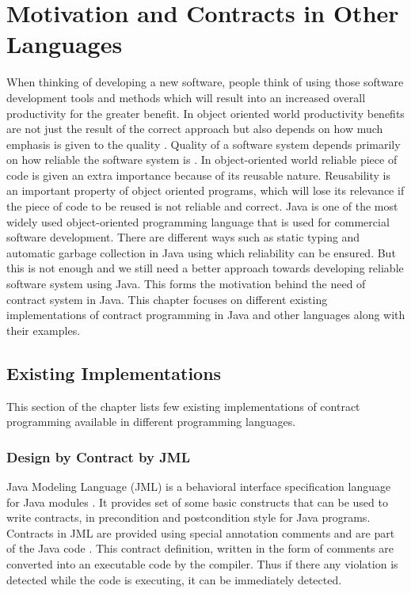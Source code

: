 \chapter{Motivation and Contracts in Other Languages}

When thinking of developing a new software, people think of using those software development tools and methods which will result into an increased overall productivity for the greater benefit. In object oriented world productivity benefits are not just the result of the correct approach but also depends on how much emphasis is given to the quality \cite{meyer1998building}.
Quality of a software system depends primarily on how reliable the software system is \cite{meyer1998building}. 
In object-oriented world reliable piece of code is given an extra importance because of its reusable nature. Reusability is an important property of object oriented programs, which will lose its relevance if the piece of code to be reused is not reliable and correct. 
Java is one of the most widely used object-oriented programming language that is used for commercial software development. There are different ways such as static typing and automatic garbage collection in Java using which reliability can be ensured. But this is not enough and we still need a better approach towards developing reliable software system using Java. This forms the motivation behind the need of contract system in Java.
This chapter focuses on different existing implementations of contract programming in Java and other languages along with their examples.

\section{Existing Implementations}

This section of the chapter lists few existing implementations of contract programming available in different programming languages. 

\subsection{Design by Contract by JML}
Java Modeling Language (JML) is a behavioral interface specification language for Java modules \cite{leavens2006design}. It provides set of some basic constructs that can be used to write contracts, in precondition and postcondition style for Java programs. Contracts in JML are provided using special annotation comments and are part of the Java code \cite{leavens2006design}. This contract definition, written in the form of comments  are converted into an executable code by the compiler. Thus if there any violation is detected while the code is executing, it can be immediately detected. 

